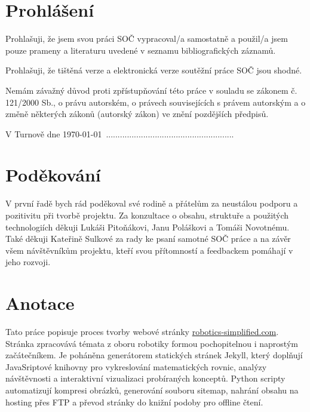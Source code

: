 \documentclass[a4paper, 12pt]{article}
\begin{document}
  \vspace{4em}

  \newpage

  \section*{\normalfont\textbf{Prohlášení}}
  Prohlašuji, že jsem svou práci SOČ vypracoval/a samostatně a použil/a jsem pouze prameny a literaturu uvedené v seznamu bibliografických záznamů.

  Prohlašuji, že tištěná verze a elektronická verze soutěžní práce SOČ jsou shodné.

  Nemám závažný důvod proti zpřístupňování této práce v souladu se zákonem č. 121/2000 Sb., o právu autorském, o právech souvisejících s právem autorským a o změně některých zákonů (autorský zákon) ve znění pozdějších předpisů.

  \qquad

  V Turnově dne \today \, .......................................................\\%

  \newpage

  \section*{\normalfont\textbf{Poděkování}}
  V první řadě bych rád poděkoval své rodině a přátelům za neustálou podporu a pozitivitu při tvorbě projektu. Za konzultace o obsahu, struktuře a použitých technologiích děkuji Lukáši Pitoňákovi, Janu Poláškovi a Tomáši Novotnému. Také děkuji Kateřině Sulkové za rady ke psaní samotné SOČ práce a na závěr všem návštěvníkům projektu, kteří svou přítomností a feedbackem pomáhají v jeho rozvoji.

  \newpage

  \section*{\normalfont\textbf{Anotace}}
  Tato práce popisuje proces tvorby webové stránky \url{robotics-simplified.com}. Stránka zpracovává témata z oboru robotiky formou pochopitelnou i naprostým začátečníkem. Je poháněna generátorem statických stránek Jekyll, který doplňují JavaSriptové knihovny pro vykreslování matematických rovnic, analýzy návštěvnosti a interaktivní vizualizaci probíraných konceptů. Python scripty automatizují kompresi obrázků, generování souboru sitemap, nahrání obsahu na hosting přes FTP a převod stránky do knižní podoby pro offline čtení.
\end{document}
